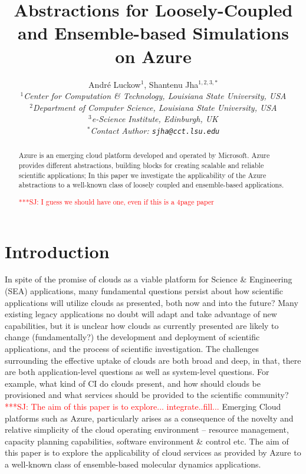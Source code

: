 \documentclass[conference,final]{IEEEtran}
\title{Abstractions for Loosely-Coupled and Ensemble-based Simulations
  on Azure\up}
\author{
Andr\'e Luckow$^{1}$, Shantenu Jha$^{1,2,3,*}$\\
  \small{\emph{$^{1}$Center for Computation \& Technology, Louisiana State University, USA}}\\
  \small{\emph{$^{2}$Department of Computer Science, Louisiana State University, USA}}\\
  \small{\emph{$^{3}$e-Science Institute, Edinburgh, UK}}\\
  \small{\emph{$^{*}$Contact Author: \texttt{sjha@cct.lsu.edu}}}\\
  \up\up\up\up
}
\newcommand{\up}{\vspace*{-1em}}
\newcommand{\jhanote}[1]{ {\textcolor{red} { ***SJ: #1 }}}
\newcommand{\jhanote}[1]{}
\begin{document}
 

\maketitle    

\begin{abstract}
Azure is an emerging cloud platform developed and operated by Microsoft. 
Azure provides different abstractions, building blocks for creating 
scalable and reliable scientific applications;    
In this paper we investigate the applicability of the Azure  abstractions
to a well-known class of loosely coupled and ensemble-based applications.

\jhanote{I guess we should have one, even if this is a 4page paper}
\up
\end{abstract}

\section{Introduction}
\up
In spite of the promise of clouds as a viable platform for Science \&
Engineering (SEA) applications, many fundamental questions persist about how
scientific applications will utilize clouds as presented, both now and
into the future? Many existing legacy applications no doubt will adapt
and take advantage of new capabilities, but it is unclear how clouds
as currently presented are likely to change (fundamentally?)  the
development and deployment of scientific applications, and the process
of scientific investigation. The challenges surrounding the effective
uptake of clouds are both broad and deep, in that, there are both
application-level questions as well as system-level questions. For
example, what kind of CI do clouds present, and how should clouds be
provisioned and what services should be provided to the scientific
community? \jhanote{The aim of this paper is to
explore... integrate..fill...} Emerging Cloud platforms such
as Azure, particularly arises as a consequence of the novelty and
relative simplicity of the cloud operating environment – resource
management, capacity planning capabilities, software environment \&
control etc. The aim of this paper is to explore the applicability 
of cloud services as provided by Azure to a well-known class of ensemble-based 
molecular dynamics applications.
 
\end{document}
